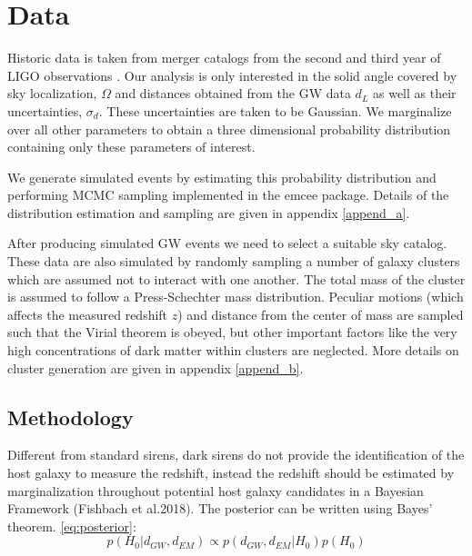 \section{Data} \label{sec:develop}

Historic data is taken from merger catalogs from the second and third year of LIGO observations \cite{GWTC_2,GWTC_3}. Our analysis is only interested in the solid angle covered by sky localization, $\Omega$ and distances obtained from the GW data $d_L$ as well as their uncertainties, $\sigma_d$. These uncertainties are taken to be Gaussian. We marginalize over all other parameters to obtain a three dimensional probability distribution containing only these parameters of interest.

We generate simulated events by estimating this probability distribution and performing MCMC sampling implemented in the emcee package. Details of the distribution estimation and sampling are given in appendix \ref{append_a}.

After producing simulated GW events we need to select a suitable sky catalog. These data are also simulated by randomly sampling a number of galaxy clusters which are assumed not to interact with one another. The total mass of the cluster is assumed to follow a Press-Schechter mass distribution\cite{Press_1974}. Peculiar motions (which affects the measured redshift $z$) and distance from the center of mass are sampled such that the Virial theorem is obeyed, but other important factors like the very high concentrations of dark matter within clusters are neglected. More details on cluster generation are given in appendix \ref{append_b}.
    
\subsection{\label{Method} Methodology}

Different from standard sirens, dark sirens do not provide the identification of the host galaxy to measure the redshift, instead the redshift should be estimated by marginalization throughout potential host galaxy candidates in a Bayesian Framework (Fishbach et al.2018)\cite{Fishbach_2019}. The posterior can be written using Bayes' theorem. 
\ref{eq:posterior}: 
\begin{equation}
    p(H_0|d_{GW}, d_{EM})\propto p(d_{GW}, d_{EM}|H_0)p(H_0)
    \label{eq:posterior}
\end{equation}

